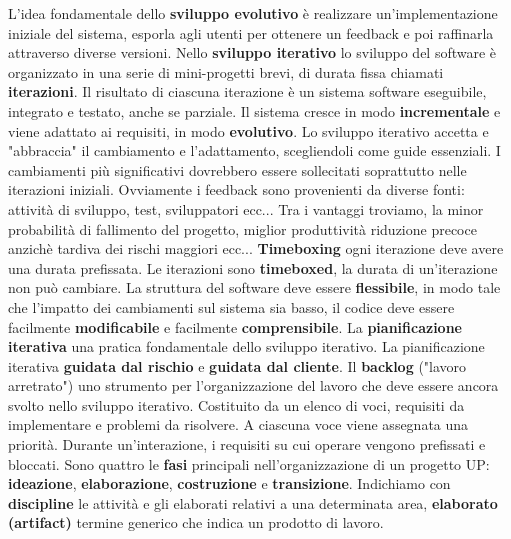 \documentclass{article}
\numberwithin{equation}{subsection}
\begin{document}
L'idea fondamentale dello \textbf{sviluppo evolutivo} è realizzare un'implementazione iniziale del sistema, esporla agli utenti per ottenere un feedback e poi raffinarla attraverso diverse versioni. Nello \textbf{sviluppo iterativo} lo sviluppo del software è organizzato in una serie di mini-progetti brevi, di durata fissa chiamati \textbf{iterazioni}. Il risultato di ciascuna iterazione è un sistema software eseguibile, integrato e testato, anche se parziale. Il sistema cresce in modo \textbf{incrementale} e viene adattato ai requisiti, in modo \textbf{evolutivo}. Lo sviluppo iterativo accetta e "abbraccia" il cambiamento e l'adattamento, scegliendoli come guide essenziali. I cambiamenti più significativi dovrebbero essere sollecitati soprattutto nelle iterazioni iniziali. Ovviamente i feedback sono provenienti da diverse fonti: attività di sviluppo, test, sviluppatori ecc... Tra i vantaggi troviamo, la minor probabilità di fallimento del progetto, miglior produttività riduzione precoce anzichè tardiva dei rischi maggiori ecc... \textbf{Timeboxing} ogni iterazione deve avere una durata prefissata. Le iterazioni sono \textbf{timeboxed}, la durata di un'iterazione non può cambiare. La struttura del software deve essere \textbf{flessibile}, in modo tale che l'impatto dei cambiamenti sul sistema sia basso, il codice deve essere facilmente \textbf{modificabile} e facilmente \textbf{comprensibile}. La \textbf{pianificazione iterativa} una pratica fondamentale dello sviluppo iterativo. La pianificazione iterativa \textbf{guidata dal rischio} e \textbf{guidata dal cliente}. Il \textbf{backlog} ("lavoro arretrato") uno strumento per l'organizzazione del lavoro che deve essere ancora svolto nello sviluppo iterativo. Costituito da un elenco di voci, requisiti da implementare e problemi da risolvere. A ciascuna voce viene assegnata una priorità. Durante un'interazione, i requisiti su cui operare vengono prefissati e bloccati. Sono quattro le \textbf{fasi} principali nell'organizzazione di un progetto UP: \textbf{ideazione}, \textbf{elaborazione}, \textbf{costruzione} e \textbf{transizione}. Indichiamo con \textbf{discipline} le attività e gli elaborati relativi a una determinata area, \textbf{elaborato (artifact)} termine generico che indica un prodotto di lavoro.
\clearpage
\end{document}
